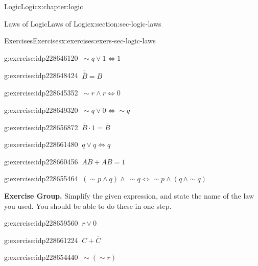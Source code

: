 \documentclass[twoside,10pt,]{book}
\numberwithin{equation}{section}
\begin{document}
\begin{chapterptx}{Logic}{}{Logic}{}{}{x:chapter:logic}
\begin{sectionptx}{Laws of Logic}{}{Laws of Logic}{}{}{x:section:sec-logic-laws}
\begin{exercises-subsection}{Exercises}{}{Exercises}{}{}{x:exercises:exers-sec-logic-laws}
\begin{exercisegroup}
\begin{divisionexerciseeg}{5}{}{}{g:exercise:idp228646120}%
\(\ \sim\!{q}{\vee} 1\Leftrightarrow 1\)\end{divisionexerciseeg}%
\begin{divisionexerciseeg}{6}{}{}{g:exercise:idp228648424}%
\(\ \overline{\overline{B}}=B\)\end{divisionexerciseeg}%
\begin{divisionexerciseeg}{7}{}{}{g:exercise:idp228645352}%
\(\ \sim\!{r}{\wedge} r\Leftrightarrow 0\)\end{divisionexerciseeg}%
\begin{divisionexerciseeg}{8}{}{}{g:exercise:idp228649320}%
\(\ \sim\!{q}{\vee} 0\Leftrightarrow\sim\!{q}\)\end{divisionexerciseeg}%
\begin{divisionexerciseeg}{9}{}{}{g:exercise:idp228656872}%
\(\ \overline{B}\cdot 1=\overline{B}\)\end{divisionexerciseeg}%
\begin{divisionexerciseeg}{10}{}{}{g:exercise:idp228661480}%
\(\ q{\vee} q\Leftrightarrow q\)\end{divisionexerciseeg}%
\begin{divisionexerciseeg}{11}{}{}{g:exercise:idp228660456}%
\(\ AB+\overline{AB}=1\)\end{divisionexerciseeg}%
\begin{divisionexerciseeg}{12}{}{}{g:exercise:idp228655464}%
\(\ (\sim\!{p}{\wedge} q){\wedge}\,\sim\!{q}\Leftrightarrow\sim\!{p}{\wedge}(q\,{\wedge}\sim\!{q})\)\end{divisionexerciseeg}%
\end{exercisegroup}
\par\medskip\noindent
\par\medskip\noindent%
\textbf{Exercise Group.}\space\space%
Simplify the given expression, and state the name of the law you used.  You should be able to do these in one step.\begin{exercisegroup}
\begin{divisionexerciseeg}{13}{}{}{g:exercise:idp228659560}%
\(\ r{\vee} 0\)\end{divisionexerciseeg}%
\begin{divisionexerciseeg}{14}{}{}{g:exercise:idp228661224}%
\(\ C+\overline{C}\)\end{divisionexerciseeg}%
\begin{divisionexerciseeg}{15}{}{}{g:exercise:idp228654440}%
\(\ \sim\!(\sim\!{r})\)\end{divisionexerciseeg}%

\end{exercisegroup}
\end{exercises-subsection}
\end{sectionptx}
\end{chapterptx}
\end{document}
